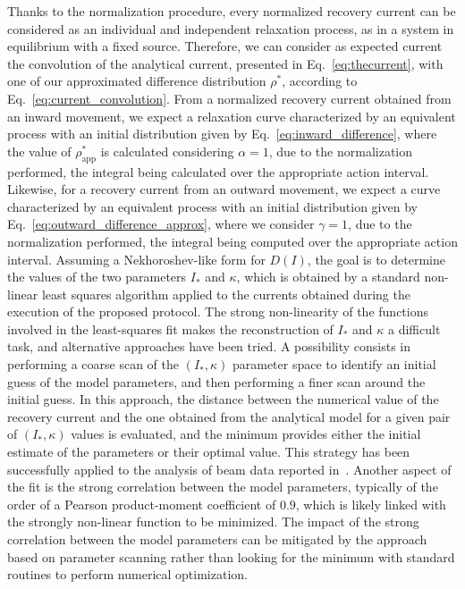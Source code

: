 Thanks to the normalization procedure, every normalized recovery current can be considered as an individual and independent relaxation process, as in a system in equilibrium with a fixed source. Therefore, we can consider as expected current the convolution of the analytical current, presented in Eq.~\eqref{eq:thecurrent}, with one of our approximated difference distribution $\rho^\ast$, {according to Eq.~\eqref{eq:current_convolution}}. From a normalized recovery current obtained from an inward movement, we expect a relaxation curve characterized by an equivalent process with an initial distribution given by Eq.~\eqref{eq:inward_difference}, where the value of $\rho^\ast_\text{app}$ is calculated considering $\alpha=1$, due to the normalization performed, the integral being calculated over the appropriate action interval. Likewise, for a recovery current from an outward movement, we expect a curve characterized by an equivalent process with an initial distribution given by Eq.~\eqref{eq:outward_difference_approx}, where we consider $\gamma=1$, due to the normalization performed, the integral being computed over the appropriate action interval. Assuming a Nekhoroshev-like form for $D(I)$, the goal is to determine the values of the two parameters $I_\ast$ and $\kappa$, which is obtained by a standard non-linear least squares algorithm applied to the currents obtained during the execution of the proposed protocol. {The strong non-linearity of the functions involved in the least-squares fit makes the reconstruction of $I_\ast$ and $\kappa$ a difficult task, and alternative approaches have been tried. A possibility consists in performing a coarse scan of the $(I_\ast, \kappa)$ parameter space to identify an initial guess of the model parameters, and then performing a finer scan around the initial guess. In this approach, the distance between the numerical value of the recovery current and the one obtained from the analytical model for a given pair of $(I_\ast, \kappa)$ values is evaluated, and the minimum provides either the initial estimate of the parameters or their optimal value. This strategy has been successfully applied to the analysis of beam data reported in~\cite{montanari:ipac22-mopost043}. Another aspect of the fit is the strong correlation between the model parameters, typically of the order of a Pearson product-moment coefficient of $0.9$, which is likely linked with the strongly non-linear function to be minimized. The impact of the strong correlation between the model parameters can be mitigated by the approach based on parameter scanning rather than looking for the minimum with standard routines to perform numerical optimization.}

